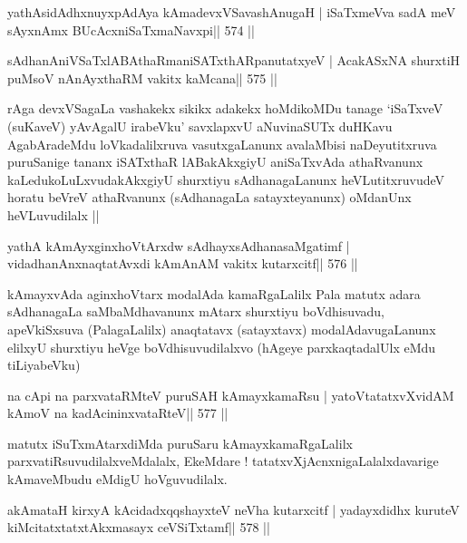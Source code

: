 \begin{shl}
yathAsidAdhxnuyxpAdAya kAmadevxVSavashAnugaH |
iSaTxmeVva sadA meV sAyxnAmx BUcAcxniSaTxmaNavxpi\hfill || 574 ||
\end{shl}

\begin{shl}
sAdhanAniVSaTxlABAthaRmaniSATxthARpanutatxyeV |
AcakASxNA shurxtiH puMsoV nAnAyxthaRM vakitx kaMcana\hfill || 575 ||
\end{shl}

\begin{artha}
rAga devxVSagaLa vashakekx sikikx adakekx hoMdikoMDu tanage `iSaTxveV
(suKaveV) yAvAgalU irabeVku' savxlapxvU aNuvinaSUTx duHKavu
AgabAradeMdu loVkadalilxruva vasutxgaLanunx avalaMbisi naDeyutitxruva
puruSanige tananx iSATxthaR lABakAkxgiyU aniSaTxvAda athaRvanunx
kaLedukoLuLxvudakAkxgiyU shurxtiyu sAdhanagaLanunx heVLutitxruvudeV
horatu beVreV athaRvanunx (sAdhanagaLa satayxteyanunx) oMdanUnx
heVLuvudilalx ||
\end{artha}



\begin{shl}
yathA kAmAyxginxhoVtArxdw sAdhayxsAdhanasaMgatimf |
vidadhanAnxnaqtatAvxdi kAmAnAM vakitx kutarxcitf\hfill || 576 ||
\end{shl}

\begin{artha}
kAmayxvAda aginxhoVtarx modalAda kamaRgaLalilx Pala matutx adara
sAdhanagaLa saMbaMdhavanunx mAtarx shurxtiyu boVdhisuvadu,
apeVkiSxsuva (PalagaLalilx) anaqtatavx (satayxtavx) modalAdavugaLanunx
elilxyU shurxtiyu heVge boVdhisuvudilalxvo (hAgeye parxkaqtadalUlx
eMdu tiLiyabeVku)
\end{artha}

\begin{shl}
na cApi na parxvataRMteV puruSAH kAmayxkamaRsu |
yatoV\s tatatxvXvidAM kAmoV na kadAcininxvataRteV\hfill || 577 ||
\end{shl}

\begin{artha}
matutx iSuTxmAtarxdiMda puruSaru kAmayxkamaRgaLalilx parxvatiRsuvudilalxveMdalalx, EkeMdare ! tatatxvXjAcnxnigaLalalxdavarige kAmaveMbudu eMdigU hoVguvudilalx.
\end{artha}

\begin{shl}
akAmataH kirxyA kAcidadxqqshayxteV neVha kutarxcitf |
yadayxdidhx kuruteV kiMcitatxtatxtAkxmasayx ceVSiTxtamf\hfill || 578 ||
\end{shl}

